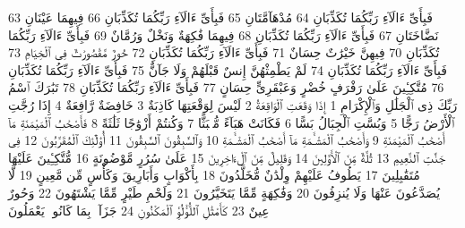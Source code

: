 {\tiny\colorbox{cl_aya}{63}} فَبِأَىِّ ءَالَآءِ رَبِّكُمَا تُكَذِّبَانِ
{\tiny\colorbox{cl_aya}{64}} مُدْهَآمَّتَانِ
{\tiny\colorbox{cl_aya}{65}} فَبِأَىِّ ءَالَآءِ رَبِّكُمَا تُكَذِّبَانِ
{\tiny\colorbox{cl_aya}{66}} فِيهِمَا عَيْنَانِ نَضَّاخَتَانِ
{\tiny\colorbox{cl_aya}{67}} فَبِأَىِّ ءَالَآءِ رَبِّكُمَا تُكَذِّبَانِ
{\tiny\colorbox{cl_aya}{68}} فِيهِمَا فَٰكِهَةٌ وَنَخْلٌ وَرُمَّانٌ
{\tiny\colorbox{cl_aya}{69}} فَبِأَىِّ ءَالَآءِ رَبِّكُمَا تُكَذِّبَانِ
{\tiny\colorbox{cl_aya}{70}} فِيهِنَّ خَيْرَٰتٌ حِسَانٌ
{\tiny\colorbox{cl_aya}{71}} فَبِأَىِّ ءَالَآءِ رَبِّكُمَا تُكَذِّبَانِ
{\tiny\colorbox{cl_aya}{72}} حُورٌ مَّقْصُورَٰتٌ فِى ٱلْخِيَامِ
{\tiny\colorbox{cl_aya}{73}} فَبِأَىِّ ءَالَآءِ رَبِّكُمَا تُكَذِّبَانِ
{\tiny\colorbox{cl_aya}{74}} لَمْ يَطْمِثْهُنَّ إِنسٌ قَبْلَهُمْ وَلَا جَآنٌّ
{\tiny\colorbox{cl_aya}{75}} فَبِأَىِّ ءَالَآءِ رَبِّكُمَا تُكَذِّبَانِ
{\tiny\colorbox{cl_aya}{76}} مُتَّكِـِٔينَ عَلَىٰ رَفْرَفٍ خُضْرٍ وَعَبْقَرِىٍّ حِسَانٍ
{\tiny\colorbox{cl_aya}{77}} فَبِأَىِّ ءَالَآءِ رَبِّكُمَا تُكَذِّبَانِ
{\tiny\colorbox{cl_aya}{78}} تَبَٰرَكَ ٱسْمُ رَبِّكَ ذِى ٱلْجَلَٰلِ وَٱلْإِكْرَامِ
{\tiny\colorbox{cl_aya}{1}} إِذَا وَقَعَتِ ٱلْوَاقِعَةُ
{\tiny\colorbox{cl_aya}{2}} لَيْسَ لِوَقْعَتِهَا كَاذِبَةٌ
{\tiny\colorbox{cl_aya}{3}} خَافِضَةٌ رَّافِعَةٌ
{\tiny\colorbox{cl_aya}{4}} إِذَا رُجَّتِ ٱلْأَرْضُ رَجًّا
{\tiny\colorbox{cl_aya}{5}} وَبُسَّتِ ٱلْجِبَالُ بَسًّا
{\tiny\colorbox{cl_aya}{6}} فَكَانَتْ هَبَآءً مُّنۢبَثًّا
{\tiny\colorbox{cl_aya}{7}} وَكُنتُمْ أَزْوَٰجًا ثَلَٰثَةً
{\tiny\colorbox{cl_aya}{8}} فَأَصْحَٰبُ ٱلْمَيْمَنَةِ مَآ أَصْحَٰبُ ٱلْمَيْمَنَةِ
{\tiny\colorbox{cl_aya}{9}} وَأَصْحَٰبُ ٱلْمَشْـَٔمَةِ مَآ أَصْحَٰبُ ٱلْمَشْـَٔمَةِ
{\tiny\colorbox{cl_aya}{10}} وَٱلسَّٰبِقُونَ ٱلسَّٰبِقُونَ
{\tiny\colorbox{cl_aya}{11}} أُو۟لَٰٓئِكَ ٱلْمُقَرَّبُونَ
{\tiny\colorbox{cl_aya}{12}} فِى جَنَّٰتِ ٱلنَّعِيمِ
{\tiny\colorbox{cl_aya}{13}} ثُلَّةٌ مِّنَ ٱلْأَوَّلِينَ
{\tiny\colorbox{cl_aya}{14}} وَقَلِيلٌ مِّنَ ٱلْءَاخِرِينَ
{\tiny\colorbox{cl_aya}{15}} عَلَىٰ سُرُرٍ مَّوْضُونَةٍ
{\tiny\colorbox{cl_aya}{16}} مُّتَّكِـِٔينَ عَلَيْهَا مُتَقَٰبِلِينَ
{\tiny\colorbox{cl_aya}{17}} يَطُوفُ عَلَيْهِمْ وِلْدَٰنٌ مُّخَلَّدُونَ
{\tiny\colorbox{cl_aya}{18}} بِأَكْوَابٍ وَأَبَارِيقَ وَكَأْسٍ مِّن مَّعِينٍ
{\tiny\colorbox{cl_aya}{19}} لَّا يُصَدَّعُونَ عَنْهَا وَلَا يُنزِفُونَ
{\tiny\colorbox{cl_aya}{20}} وَفَٰكِهَةٍ مِّمَّا يَتَخَيَّرُونَ
{\tiny\colorbox{cl_aya}{21}} وَلَحْمِ طَيْرٍ مِّمَّا يَشْتَهُونَ
{\tiny\colorbox{cl_aya}{22}} وَحُورٌ عِينٌ
{\tiny\colorbox{cl_aya}{23}} كَأَمْثَٰلِ ٱللُّؤْلُؤِ ٱلْمَكْنُونِ
{\tiny\colorbox{cl_aya}{24}} جَزَآءًۢ بِمَا كَانُوا۟ يَعْمَلُونَ

